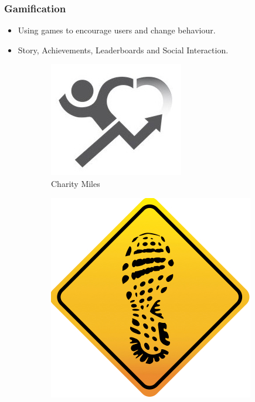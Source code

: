 \documentclass{beamer}
\begin{document}
\begin{frame}
  \frametitle{Gamification}
  \begin{itemize}
    \item Using games to encourage users and change behaviour. 
    \item Story, Achievements, Leaderboards and Social Interaction.
  \end{itemize}

  \begin{figure}[h]
    \centering
    \begin{subfigure}[b]{0.3\textwidth}
      \includegraphics[width=\textwidth]{images/charity-miles.jpg}
      \caption{Charity Miles}
    \end{subfigure}
    \hspace{0.02\textwidth}
    \begin{subfigure}[b]{0.3\textwidth}
      \includegraphics[width=\textwidth]{images/walk.png}

\end{subfigure}
\end{figure}
\end{frame}
\end{document}
